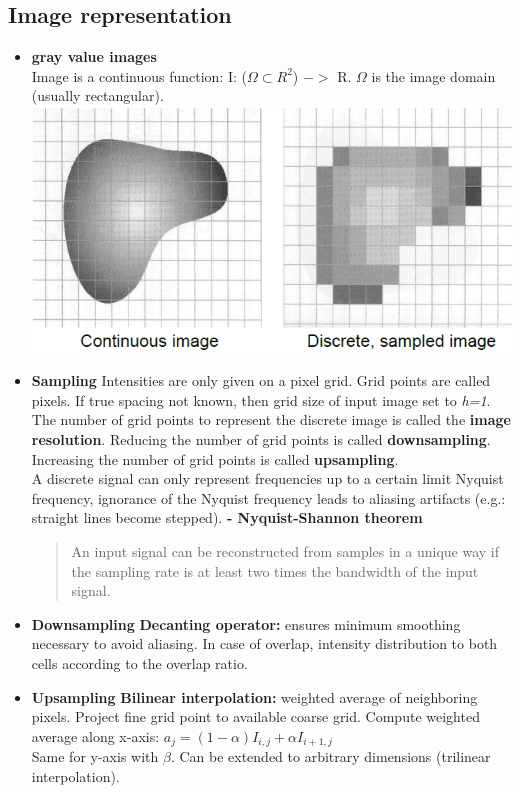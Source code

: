 \documentclass{article}
\begin{document}
\subsection{Image representation}
\begin{itemize}
\item \textbf{gray value images}\\
Image is a continuous function: I: ($\Omega \subset R^2$) $->$ R. $\Omega$ is the image domain (usually rectangular).\\
\includegraphics[scale=0.7]{13.png}
\item \textbf{Sampling}
Intensities are only given on a pixel grid. Grid points are called pixels. If true spacing not known, then grid size of input image set to \textit{h=1}.\\
The number of grid points to represent the discrete image is called the\textbf{ image resolution}. Reducing the number of grid points is called \textbf{downsampling}. Increasing the number of grid points is called \textbf{upsampling}.\\
A discrete signal can only represent frequencies up to a certain limit Nyquist frequency, ignorance of the Nyquist frequency leads to aliasing artifacts (e.g.: straight lines become stepped). 
\textbf{- Nyquist-Shannon theorem}\\
\begin{quote}
An input signal can be reconstructed from samples in a unique way if the
sampling rate is at least two times the bandwidth of the input signal.
\end{quote}

\item \textbf{Downsampling}
\textbf{Decanting operator:} ensures minimum smoothing necessary to avoid aliasing. In case of overlap, intensity distribution to both cells according to the overlap ratio. 
\item \textbf{Upsampling} 
\textbf{Bilinear interpolation: }weighted average of neighboring pixels. Project fine grid point to available coarse grid. Compute weighted average along x-axis: $a_j=(1-\alpha)I_{i,j}+\alpha I_{i+1,j}$\\
Same for y-axis with $\beta$. Can be extended to arbitrary dimensions (trilinear interpolation). 
\end{itemize}
\end{document}
